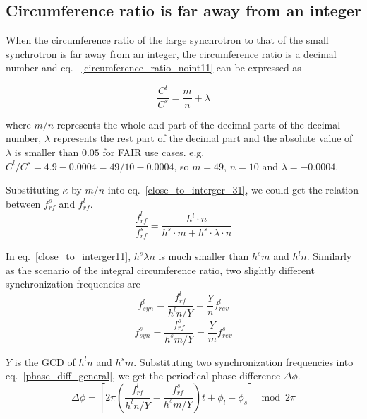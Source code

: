 \subsection{Circumference ratio is far away from an integer}
When the circumference ratio of the large synchrotron to that of the small synchrotron is far away from an integer, the circumference ratio is a decimal number and eq. ~\ref{circumference_ratio_noint11} can be expressed as

\begin{equation}
\frac{C^l}{C^s}=\frac{m}{n}+ \lambda \label{circumference_ratio_noint11}
\end{equation}

where $m/n$ represents the whole and part of the decimal parts of the decimal number, $\lambda$ represents the rest part of the decimal part and the absolute value of $\lambda$ is smaller than $0.05$ for FAIR use cases. e.g. $C^l/C^s=4.9-0.0004=49/10-0.0004$, so $m=49$, $n=10$ and $\lambda=-0.0004$. 

Substituting $\kappa$ by $m/n$ into eq.~\ref{close_to_interger_31}, we could get the relation between $f_{\mathit{rf}}^{s}$ and $f_{\mathit{rf}}^{l}$.
\begin{equation} 
\frac{f_{\mathit{rf}}^{l}}{f_{\mathit{rf}}^{s}}=\frac{h^l\cdot n}{h^s \cdot m+ h^s \cdot\lambda\cdot n}\label{close_to_interger11}
\end{equation}

In eq.~\ref{close_to_interger11}, $h^s\lambda n $ is much smaller than $h^s m$ and $h^l n$. Similarly as the scenario of the integral circumference ratio, two slightly different synchronization frequencies are 
\begin{equation}
f_{\mathit{syn}}^{l}=\frac{f_{\mathit{rf}}^{l}}{h^{l}n/Y}=\frac{Y}{n}f_{\mathit{rev}}^{l} \label{synch_freq111}
\end{equation}
\begin{equation}
f_{\mathit{syn}}^{s}=\frac{f_{\mathit{rf}}^{s}}{h^{s}m/Y}=\frac{Y}{m}f_{\mathit{rev}}^{s} \label{synch_freq222}
\end{equation}

$Y$ is the GCD of $h^l n$ and $h^s m$. Substituting two synchronization frequencies into eq.~\ref{phase_diff_general}, we get the periodical phase difference $\Delta \phi$.
\begin{equation}
	\Delta \phi=[2\pi(\frac{f_{\mathit{rf}}^{l}}{h^{l}n/Y}-\frac{f_{\mathit{rf}}^{s}}{h^{s}m/Y})t+\phi_l-\phi_s] \mod 2\pi \label{phase_diff_general11}
\end{equation}

